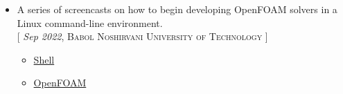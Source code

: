 %
%
%


\vspace{5pt}

\begin{itemize}
  \item A series of screencasts on how to begin developing OpenFOAM solvers in a Linux command-line environment.\\ {[ {\small\emph{Sep 2022}, \textsc{Babol Noshirvani University of Technology}} ]}

    \begin{itemize}
        \item \href{https://www.youtube.com/playlist?list=PLdtuHsHJY9eicHEiF-xV6Iz4Jw5dQ3-ei}{\color{basecolor}Shell}
        \item \href{https://www.youtube.com/playlist?list=PLdtuHsHJY9ejxkbkqBSpIHpGfhgte7cbY}{\color{basecolor}OpenFOAM}
    \end{itemize}

\end{itemize}
